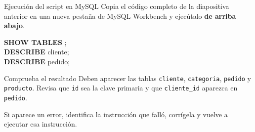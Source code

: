 \documentclass[aspectratio=169,10pt,c]{beamer}
\newcommand{\tbl}[1]{\textcolor{utpNaranja}{\texttt{#1}}}
\newcommand{\kw}[1]{\textcolor{utpRojo}{\textbf{#1}}}
\newcommand{\nuevo}[1]{{%
  \setlength{\fboxsep}{1.2pt}%
  \begingroup
  \renewcommand{\kw}[1]{\textcolor{utpNegro}{\textbf{##1}}}%
  \colorbox{yellow!45}{\textcolor{utpNegro}{#1}}%
  \endgroup}}
\newcommand{\ins}[1]{\tikz[baseline=-0.5ex]{\node[rounded corners=2pt,fill=utpRojo,text=white,
  font=\bfseries\scriptsize,inner xsep=5pt,inner ysep=2.5pt] {#1};}}
\newenvironment{sqlcode}[1][.86\textwidth]
  {\begin{center}\begin{lrbox}{\sqlbuf}\begin{minipage}{#1}\ttfamily\footnotesize\vspace{6pt}\raggedright}
  {\vspace{6pt}\end{minipage}\end{lrbox}\colorbox{utpGrisClaro}{\usebox{\sqlbuf}}\end{center}}
\begin{document}
\begin{frame}{\ins{Práctica 4} Ejecución del script en MySQL}
\small Copia el código completo de la diapositiva anterior en una nueva pestaña de MySQL Workbench y ejecútalo \textbf{de arriba abajo}.
\vspace{0.45cm}

\begin{sqlcode}[.66\textwidth]
\nuevo{\kw{SHOW TABLES}};\\[7pt]
\nuevo{\kw{DESCRIBE}} cliente;\\
\nuevo{\kw{DESCRIBE}} pedido;
\end{sqlcode}
\vspace{0.35cm}

\begin{block}{Comprueba el resultado}
\small Deben aparecer las tablas \tbl{cliente}, \tbl{categoria}, \tbl{pedido} y \tbl{producto}. Revisa que \texttt{id} sea la clave primaria y que \texttt{cliente\_id} aparezca en \tbl{pedido}.
\end{block}
\vspace{0.3cm}

\small Si aparece un error, identifica la instrucción que falló, corrígela y vuelve a ejecutar esa instrucción.
\end{frame}
\end{document}
